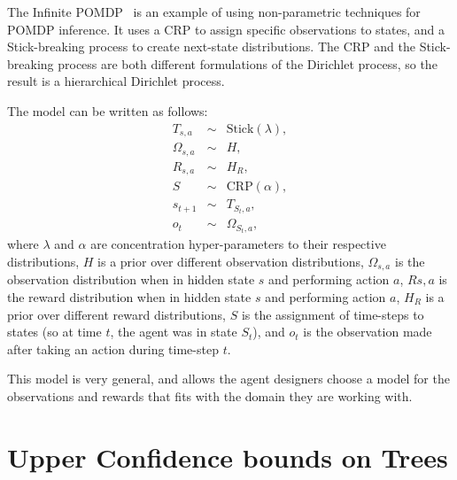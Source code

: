 The Infinite POMDP~\cite{doshi2009infinite} is an example of using non-parametric techniques for POMDP inference. It uses a CRP to assign specific observations to states, and a Stick-breaking process to create next-state distributions. The CRP and the Stick-breaking process are both different formulations of the Dirichlet process, so the result is a hierarchical Dirichlet process.

The model can be written as follows:
\begin{eqnarray}
T_{s,a} &\sim& \mbox{Stick}(\lambda),\\
\Omega_{s,a} &\sim& H,\\
R_{s,a} &\sim& H_R,\\
S &\sim& \mbox{CRP}(\alpha),\\
s_{t+1} &\sim& T_{S_t,a},\\
o_t &\sim& \Omega_{S_t,a},
\end{eqnarray}
where $\lambda$ and $\alpha$ are concentration hyper-parameters to their respective distributions, $H$ is a prior over different observation distributions, $\Omega_{s,a}$ is the observation distribution when in hidden state $s$ and performing action $a$, $R{s,a}$ is the reward distribution when in hidden state $s$ and performing action $a$, $H_R$ is a prior over different reward distributions, $S$ is the assignment of time-steps to states (so at time $t$, the agent was in state $S_t$), and $o_t$ is the observation made after taking an action during time-step $t$.

This model is very general, and allows the agent designers choose a model for the observations and rewards that fits with the domain they are working with.

\section{Upper Confidence bounds on Trees}


